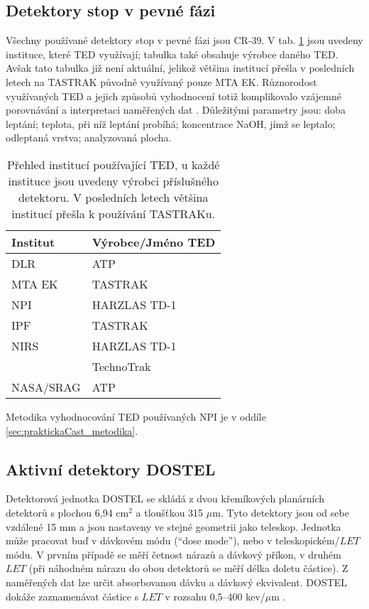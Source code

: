 \subsection{Detektory stop v pevné fázi}
Všechny používané detektory stop v pevné fázi jsou CR-39. V tab. \ref{tab:dosis_pouzivaneTED} jsou uvedeny instituce, které TED využívají; tabulka také obsahuje výrobce daného TED. Avšak tato tabulka již není aktuální, jelikož většina institucí přešla v posledních letech na TASTRAK původně využívaný pouze MTA EK. Různorodost využívaných TED a jejich způsobů vyhodnocení totiž komplikovalo vzájemné porovnávání a interpretaci naměřených dat \cite{cesky}. Důležitými parametry jsou: doba leptání; teplota, při níž leptání probíhá; koncentrace NaOH, jímž se leptalo; odleptaná vrstva; analyzovaná plocha.
\begin{table}[h]
  \def\arraystretch{0.8}
  \centering
  \caption{Přehled institucí používající TED, u každé instituce jsou uvedeny výrobci příslušného detektoru. V posledních letech většina institucí přešla k používání TASTRAKu. \cite{dosis}}
  \label{tab:dosis_pouzivaneTED}
  \begin{tabular}{ll}
	\toprule
	Institut& Výrobce/Jméno TED\\
	\midrule
	DLR&ATP\\
	MTA EK&TASTRAK\\
	NPI&HARZLAS TD-1\\
	IPF&TASTRAK\\ 
	NIRS&HARZLAS TD-1\\
		&TechnoTrak\\
	NASA/SRAG&ATP\\
	\bottomrule
  \end{tabular}
\end{table}

Metodika vyhodnocování TED používaných NPI je v oddíle \ref{sec:praktickaCast_metodika}.

\subsection{Aktivní detektory DOSTEL}\label{experimentDosis_activeDetectors}
Detektorová jednotka DOSTEL se skládá z dvou křemíkových planárních detektorů s plochou  6,94 cm$^2$ a tloušťkou 315 $\mu$m. Tyto detektory jsou od sebe vzdálené 15 mm a jsou nastaveny ve stejné geometrii jako teleskop. Jednotka může pracovat buď v dávkovém módu (``dose mode''), nebo v teleskopickém/$\mathit{LET}$ módu. V prvním případě se měří četnost nárazů a dávkový příkon, v druhém $\mathit{LET}$ (při náhodném nárazu do obou detektorů se měří délka doletu částice). Z naměřených dat lze určit absorbovanou dávku a dávkový ekvivalent. DOSTEL dokáže zaznamenávat částice s $\mathit{LET}$ v rozsahu 0,5--400 kev/$\mu$m \cite{activeDetectors}. 

